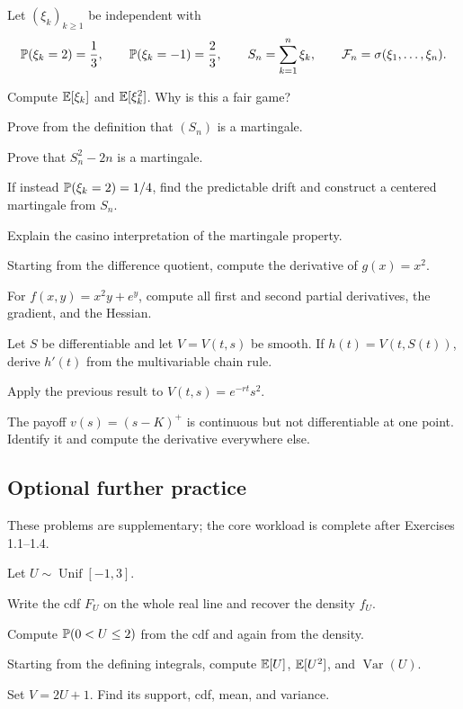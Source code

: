 \begin{exercise}
Let $(\xi_k)_{k\geq1}$ be independent with
\[
\mathbb P(\xi_k=2)=\frac13,\qquad \mathbb P(\xi_k=-1)=\frac23,
\qquad S_n=\sum_{k=1}^n\xi_k,
\qquad \mathcal F_n=\sigma(\xi_1,\ldots,\xi_n).
\]
\begin{exparts}
  \item Compute $\mathbb E[\xi_k]$ and $\mathbb E[\xi_k^2]$. Why is this a fair game?
  \item Prove from the definition that $(S_n)$ is a martingale.
  \item Prove that $S_n^2-2n$ is a martingale.
  \item If instead $\mathbb P(\xi_k=2)=1/4$, find the predictable drift and
  construct a centered martingale from $S_n$.
  \item Explain the casino interpretation of the martingale property.
\end{exparts}
\end{exercise}

\begin{exercise}\leavevmode
\begin{exparts}
  \item Starting from the difference quotient, compute the derivative of
  $g(x)=x^2$.
  \item For $f(x,y)=x^2y+e^y$, compute all first and second partial
  derivatives, the gradient, and the Hessian.
  \item Let $S$ be differentiable and let $V=V(t,s)$ be smooth. If
  $h(t)=V(t,S(t))$, derive $h'(t)$ from the multivariable chain rule.
  \item Apply the previous result to $V(t,s)=e^{-rt}s^2$.
  \item The payoff $v(s)=(s-K)^+$ is continuous but not differentiable at one
  point. Identify it and compute the derivative everywhere else.
\end{exparts}
\end{exercise}
\fi

\ifIncludeFurther
{}
\subsection*{Optional further practice}
\noindent These problems are supplementary; the core workload is complete after Exercises 1.1--1.4.
\setcounter{exercise}{4}
\begin{exercise}
Let $U\sim\operatorname{Unif}[-1,3]$.
\begin{exparts}
  \item Write the cdf $F_U$ on the whole real line and recover the density $f_U$.
  \item Compute $\mathbb P(0<U\leq2)$ from the cdf and again from the density.
  \item Starting from the defining integrals, compute $\mathbb E[U]$, $\mathbb E[U^2]$,
  and $\operatorname{Var}(U)$.
  \item Set $V=2U+1$. Find its support, cdf, mean, and variance.
\end{exparts}
\end{exercise}

